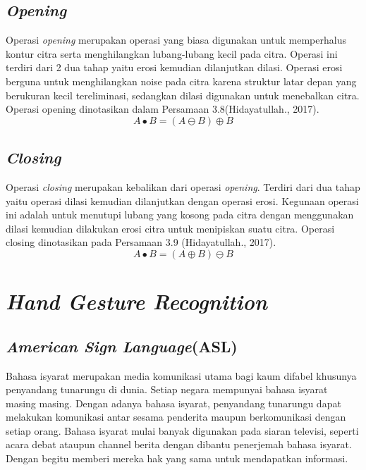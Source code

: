\subsection{\emph{Opening}}
Operasi \emph{opening} merupakan operasi yang biasa digunakan untuk memperhalus kontur citra serta menghilangkan lubang-lubang kecil pada citra. Operasi ini terdiri dari 2 dua tahap yaitu erosi kemudian dilanjutkan dilasi. Operasi erosi berguna untuk menghilangkan noise pada citra karena struktur latar depan yang berukuran kecil tereliminasi, sedangkan dilasi digunakan untuk menebalkan citra. Operasi opening dinotasikan dalam Persamaan 3.8(Hidayatullah., 2017).
\begin{equation}
A \bullet B = (A \ominus B) \oplus B
\end{equation}

\subsection{\emph{Closing}}
Operasi \emph{closing} merupakan kebalikan dari operasi \emph{opening}. Terdiri dari dua tahap yaitu operasi dilasi kemudian dilanjutkan dengan operasi erosi. Kegunaan operasi ini adalah untuk menutupi lubang yang kosong pada citra dengan menggunakan dilasi kemudian dilakukan erosi citra untuk menipiskan suatu citra. Operasi closing dinotasikan pada Persamaan 3.9 (Hidayatullah., 2017).
\begin{equation}
A \bullet B = (A \oplus B) \ominus B
\end{equation}
\section{\emph{Hand Gesture Recognition}}

\subsection{\emph{American Sign Language}(ASL)}
Bahasa isyarat merupakan media komunikasi utama bagi kaum difabel khusunya penyandang tunarungu di dunia. Setiap negara mempunyai bahasa isyarat masing masing. Dengan adanya bahasa isyarat, penyandang tunarungu dapat melakukan komunikasi antar sesama penderita maupun berkomunikasi dengan setiap orang. Bahasa isyarat mulai banyak digunakan pada siaran televisi, seperti acara debat ataupun channel berita dengan dibantu penerjemah bahasa isyarat. Dengan begitu memberi mereka hak yang sama untuk mendapatkan informasi. 


